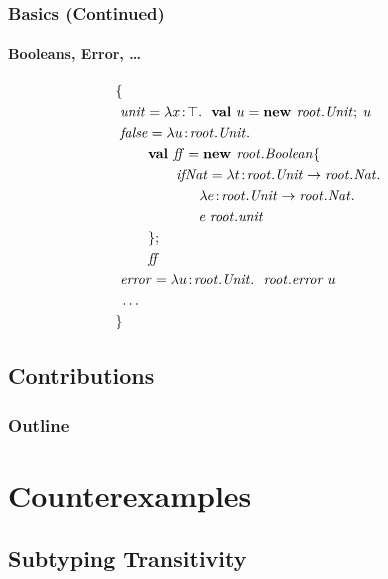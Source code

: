 \documentclass{beamer}
\begin{document}
\begin{frame}
\frametitle{Basics (Continued)}
\framesubtitle{Booleans, Error, \ldots}
\begin{align*}
&\mlldefs{\\
&\ \mi{unit}  = \abs x \Top {\new u {\mi{root}.\mi{Unit}} u}\\
&\ \mi{false} = \abs u {\mi{root}.\mi{Unit}} {\\
&\ \gap \mlnew {\mi{ff}} {\mi{root}.\mi{Boolean} \mlldefs{\\
&\ \gap\gap {\mi{ifNat}} = \abs t {\mi{root}.\mi{Unit} \tfun \mi{root}.\mi{Nat}} {\\&\gap\gap\gap\abs e {\mi{root}.\mi{Unit} \tfun \mi{root}.\mi{Nat}}\\&\gap\gap\gap\app e {\mi{root}.\mi{unit}}}\\
&\ \gap}}{
\ \gap \mi{ff}}
&}\\
&\ \mi{error} = \abs u {\mi{root}.\mi{Unit}} {\app {\mi{root}.\mi{error}} u}\\
&\ \ldots\\
&}
\end{align*}
\end{frame}

\subsection{Contributions}
\begin{frame}
\frametitle{Outline}
\tableofcontents
\end{frame}

\section{Counterexamples}

\subsection{Subtyping Transitivity}
\end{document}
